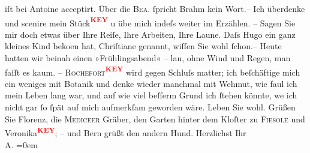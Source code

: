 \begin{ledgroupsized}[t]{13cm}
               iſt {\pb}bei Antoine acceptirt. Über die \textsc{Bea.} ſpricht Brahm kein Wort.– Ich überdenke
               und scenire mein Stück\textcolor{red}{\textsuperscript{\textbf{KEY}}} u übe mich
               indeſs weiter im Erzählen. \pend
           \pstart
           – Sagen Sie mir doch etwas über Ihre Reiſe, Ihre Arbeiten, Ihre Laune. Daſs Hugo ein ganz kleines Kind beko{\geminationm}en hat, Chriſtiane genannt, wiſſen Sie wohl ſchon.– Heute {\pb}hatten wir beinah einen
               »Frühlingsabend« – lau, ohne Wind und Regen, man faſſt es kaum. – \textsc{Rochefort\textcolor{red}{\textsuperscript{\textbf{KEY}}}} wird gegen Schluſs matter; ich beſchäftige mich ein weniges mit Botanik und
               denke wieder manchmal mit Wehmut, wie faul ich mein Leben lang war, und auf wie viel
               beſſerm Grund ich {\pb}ſtehen könnte,
                  we{\geminationn} ich nicht gar ſo ſpät auf mich aufmerkſam
               geworden wäre. \pend
           \pstart
           Leben Sie wohl. Grüßen Sie Florenz, die \textsc{Mediceer} Gräber, den Garten
               hinter dem Kloſter zu \textsc{Fiesole} und Veronika\textcolor{red}{\textsuperscript{\textbf{KEY}}}; – und Bern grüßt den andern Hund. \pend
           \pstart
           Herzlichst Ihr {\\[\baselineskip]}\spacefill\mbox{A.}\pend
           \leftskip=0em{}
         
         \endnumbering{}\end{ledgroupsized}\begin{anhang}\end{anhang}\newcommand{\dateiname}{L02974}\newcommand{\titel}{Arthur Schnitzler an Felix Salten, 27. 5. 1902}\newcommand{\editorInnen}{Martin Anton Müller und Laura Untner}
      